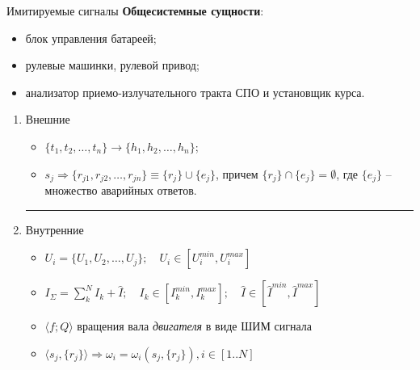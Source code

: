 \begin{frame}{Имитируемые сигналы}
    \textbf{Общесистемные сущности}:
    \begin{itemize}
        \item<1->[2.0]   блок управления батареей;
        \item<1->[1.5]   рулевые машинки, рулевой привод;
        \item<1->[1.33] анализатор приемо-излучательного тракта СПО и установщик курса.
    \end{itemize}
    \begin{enumerate}
        \item<2-> Внешние
        \begin{itemize}
            \item<2->[Глубина] $\{t_1, t_2, \ldots, t_n\} \rightarrow \{h_1, h_2, \ldots, h_n\}$;
            \item<3->[Эхо-сигнал] $s_j \Rightarrow \{r_{j1}, r_{j2}, \ldots, r_{jn}\} \equiv \{r_j\} \cup \{e_j\}$, причем $\{r_j\} \cap \{e_j\} = \emptyset$,
                где $\{e_j\}$ -- множество аварийных ответов.
        \end{itemize}\hrule{}\vspace{5pt}
        \item<4-> Внутренние
        \begin{itemize}
            \item<4->[Напряжения] $U_i = \{U_1, U_2, \ldots, U_j\};\quad U_i \in [U_i^{min}, U_i^{max}]$
            \item<4->[Токи] $I_\Sigma = \sum_k^N I_k + \hat I;\quad I_k \in [I_k^{min}, I_k^{max}];\quad \hat I \in [\hat I^{min}, \hat I^{max}]$
            \item<5->[СУД] $\langle f; Q \rangle$ вращения вала \textit{двигателя} в виде ШИМ сигнала
            \item<6->[Руление] $\langle s_j, \{r_j\} \rangle \Rightarrow \omega_i = \omega_i(s_j, \{r_j\}), i\in [1..N]$
        \end{itemize}    
    \end{enumerate}
\end{frame}
\note{}


